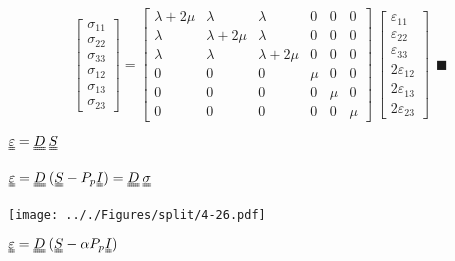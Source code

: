 \documentclass[onecolumn,11pt]{report}
\def\lthtmlcheckvsize{\ifdim\ht\sizebox<\vsize 
  \ifdim\wd\sizebox<\hsize\expandafter\hfill\fi \expandafter\vfill
  \else\expandafter\vss\fi}%
\begin{document}
{\newpage\clearpage
{}%
\begin{displaymath}%
	\left[
\begin{array} {c}
\sigma_{11} \\
\sigma_{22} \\
\sigma_{33} \\
\sigma_{12} \\
\sigma_{13} \\
\sigma_{23}
\end{array}
\right]
=
\left[
\begin{array}{cccccc}
\lambda + 2\mu & \lambda & \lambda & 0 & 0 & 0\\
\lambda & \lambda + 2 \mu & \lambda & 0 & 0 & 0\\
\lambda & \lambda & \lambda + 2 \mu & 0 & 0 & 0\\
0 & 0 & 0 & \mu & 0 & 0 \\
0 & 0 & 0 & 0 & \mu & 0 \\
0 & 0 & 0 & 0 & 0 & \mu
\end{array}
\right]
\:
\left[
\begin{array} {c}
\varepsilon_{11} \\
\varepsilon_{22} \\
\varepsilon_{33} \\
2 \varepsilon_{12} \\
2 \varepsilon_{13} \\
2 \varepsilon_{23}
\end{array}
\right] \: \: \blacksquare\end{displaymath}%
\lthtmldisplayZ
\lthtmlcheckvsize\clearpage}

{\newpage\clearpage
{}%
$ \uuline{\varepsilon} = \uuline{D} \: \uuline{S}$%
\lthtmlindisplaymathZ
\lthtmlcheckvsize\clearpage}

{\newpage\clearpage
{}%
$\displaystyle \uuline{\varepsilon} = \uuline{D} \: (\uuline{S} - P_p \uuline{I})  = \uuline{D} \: \uuline{\sigma}$%
\lthtmlindisplaymathZ
\lthtmlcheckvsize\clearpage}

{\newpage\clearpage
{}%
\texttt{[image: .././Figures/split/4-26.pdf]}%
\lthtmlpictureZ
\lthtmlcheckvsize\clearpage}

{\newpage\clearpage
{}%
$\displaystyle \uuline{\varepsilon} = \uuline{D} \: (\uuline{S} - \alpha P_p \uuline{I})$%
\lthtmlindisplaymathZ
\lthtmlcheckvsize\clearpage}
\end{document}

